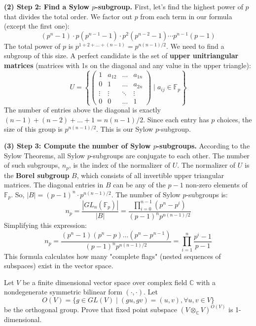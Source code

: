 \begin{solution}
\textbf{(2) Step 2: Find a Sylow $p$-subgroup.}
First, let's find the highest power of $p$ that divides the total order. We factor out $p$ from each term in our formula (except the first one):
\[ (p^n - 1) \cdot p(p^{n-1}-1) \cdot p^2(p^{n-2}-1) \cdots p^{n-1}(p-1) \]
The total power of $p$ is $p^{1 + 2 + \dots + (n-1)} = p^{n(n-1)/2}$.
We need to find a subgroup of this size. A perfect candidate is the set of \textbf{upper unitriangular matrices} (matrices with 1s on the diagonal and any value in the upper triangle):
\[ U = \left\{ \begin{pmatrix} 1 & a_{12} & \dots & a_{1n} \\ 0 & 1 & \dots & a_{2n} \\ \vdots & \vdots & \ddots & \vdots \\ 0 & 0 & \dots & 1 \end{pmatrix} \mid a_{ij} \in \mathbb{F}_p \right\} \]
The number of entries above the diagonal is exactly $(n-1) + (n-2) + \dots + 1 = n(n-1)/2$. Since each entry has $p$ choices, the size of this group is $p^{n(n-1)/2}$. This is our Sylow $p$-subgroup.

\textbf{(3) Step 3: Compute the number of Sylow $p$-subgroups.}
According to the Sylow Theorems, all Sylow $p$-subgroups are conjugate to each other. The number of such subgroups, $n_p$, is the index of the normalizer of $U$.
The normalizer of $U$ is the \textbf{Borel subgroup} $B$, which consists of all invertible upper triangular matrices. 
The diagonal entries in $B$ can be any of the $p-1$ non-zero elements of $\mathbb{F}_p$. So, $|B| = (p-1)^n \cdot p^{n(n-1)/2}$.
The number of Sylow $p$-subgroups is:
\[ n_p = \frac{|GL_n(\mathbb{F}_p)|}{|B|} = \frac{\prod_{i=0}^{n-1} (p^n - p^i)}{(p-1)^n p^{n(n-1)/2}} \]
Simplifying this expression:
\[ n_p = \frac{(p^n-1)(p^n-p)\dots(p^n-p^{n-1})}{(p-1)^n p^{n(n-1)/2}} = \prod_{i=1}^n \frac{p^i - 1}{p - 1} \]
This formula calculates how many "complete flags" (nested sequences of subspaces) exist in the vector space.
\end{solution}

\begin{exercise}
\label{algebra:2012:3}
Let $V$ be a finite dimensional vector space over complex field $\mathbb{C}$ with a nondegenerate symmetric bilinear form $(\cdot, \cdot)$. Let
\[ O(V) = \{ g \in GL(V) \mid (gu, gv) = (u, v), \forall u, v \in V \} \]
be the orthogonal group. Prove that fixed point subspace $(V \otimes_{\mathbb{C}} V)^{O(V)}$ is 1-dimensional.
\end{exercise}

